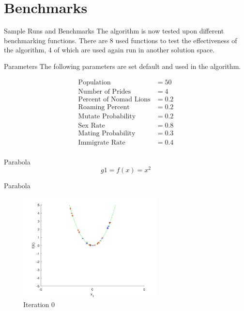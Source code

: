 \documentclass[xcolor=table]{beamer}
\begin{document}
\section{Benchmarks}

\begin{frame}{Sample Runs and Benchmarks}
The algorithm is now tested upon different benchmarking functions. There are 8 used functions to test the effectiveness of the algorithm, 4 of which are used again run in another solution space.
\end{frame}
\begin{frame}{Parameters}
The following parameters are set default and used in the algorithm.

\begin{align*}
\text{Population} &= 50\\
\text{Number of Prides} &= 4\\
\text{Percent of Nomad Lions} &= 0.2\\
\text{Roaming Percent} &= 0.2\\
\text{Mutate Probability} &= 0.2\\
\text{Sex Rate} &= 0.8\\
\text{Mating Probability} &= 0.3\\
\text{Immigrate Rate} &= 0.4\\
\end{align*}
\end{frame}
\begin{frame}{Parabola}
$$
  g1=f(x) = x^2
$$
\end{frame}
\begin{frame}{Parabola}
  \begin{figure}[h]
  \begin{center}
    \includegraphics[width=0.65\textwidth]{img/smpl/circ/loa-iter-0}
    \caption{Iteration 0}
  \end{center}
  \end{figure}
\end{frame}
\end{document}
